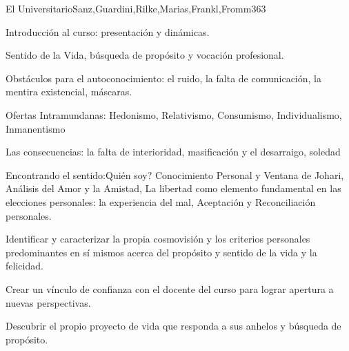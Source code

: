 \begin{syllabus}
\begin{unit}{El Universitario}{Sanz,Guardini,Rilke,Marias,Frankl,Fromm}{36}{3}
\begin{topics}
	\item Introducción al curso: presentación y dinámicas.
	\item Sentido de la Vida, búsqueda de propósito y vocación profesional.
	\item Obstáculos para el autoconocimiento: el ruido, la falta de comunicación, la mentira existencial, máscaras.
	\item Ofertas Intramundanas: Hedonismo, Relativismo, Consumismo, Individualismo, Inmanentismo
	\item Las consecuencias: la falta de interioridad, masificación y el desarraigo, soledad
	\item Encontrando el sentido:Quién soy? Conocimiento Personal y Ventana de Johari, Análisis del Amor y la Amistad, La libertad como elemento fundamental en las elecciones personales: la experiencia del mal, Aceptación y Reconciliación personales.
\end{topics}
\begin{learningoutcomes}
	\item Identificar y caracterizar la propia cosmovisión y los criterios personales predominantes en sí mismos acerca del propósito y sentido de la vida y la felicidad.
	\item Crear un vínculo de confianza con el docente del curso para lograr apertura a nuevas perspectivas.
	\item Descubrir el propio proyecto de vida que responda a sus anhelos y búsqueda de propósito.
\end{learningoutcomes}
\end{unit}


\end{syllabus}
